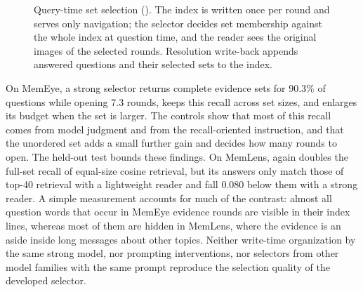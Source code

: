 \begin{figure}[t]
\centering
{}
\caption{Query-time set selection (\qss{}). The index is written once per round and serves only navigation; the selector decides set membership against the whole index at question time, and the reader sees the original images of the selected rounds. Resolution write-back appends answered questions and their selected sets to the index.}
\label{fig:overview}
\end{figure}

On MemEye, a strong selector returns complete evidence sets for 90.3\% of questions while opening 7.3 rounds, keeps this recall across set sizes, and enlarges its budget when the set is larger. The controls show that most of this recall comes from model judgment and from the recall-oriented instruction, and that the unordered set adds a small further gain and decides how many rounds to open. The held-out test bounds these findings. On MemLens, \qss{} again doubles the full-set recall of equal-size cosine retrieval, but its answers only match those of top-40 retrieval with a lightweight reader and fall 0.080 below them with a strong reader. A simple measurement accounts for much of the contrast: almost all question words that occur in MemEye evidence rounds are visible in their index lines, whereas most of them are hidden in MemLens, where the evidence is an aside inside long messages about other topics. Neither write-time organization by the same strong model, nor prompting interventions, nor selectors from other model families with the same prompt reproduce the selection quality of the developed selector.

